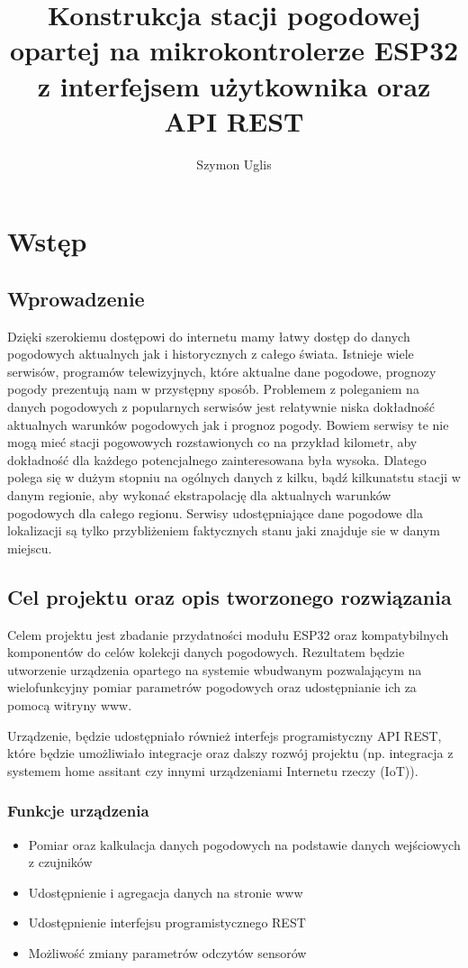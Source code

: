 \documentclass[12pt,a4paper]{article}
\title{Konstrukcja stacji pogodowej opartej na mikrokontrolerze ESP32 z interfejsem użytkownika oraz API REST}
\author{Szymon Uglis}
\begin{document}
\justifying

\nocite{*}

\begin{titlepage}
    
\end{titlepage}

\tableofcontents{}
\pagebreak

\section{Wstęp}

\subsection{Wprowadzenie}
Dzięki szerokiemu dostępowi do internetu mamy łatwy dostęp do danych pogodowych aktualnych jak i historycznych z całego świata. Istnieje wiele
serwisów, programów telewizyjnych, które aktualne dane pogodowe, prognozy pogody prezentują nam w przystępny sposób.
Problemem z poleganiem na danych pogodowych z popularnych serwisów jest relatywnie niska dokładność aktualnych warunków pogodowych jak i prognoz pogody.
Bowiem serwisy te nie mogą mieć stacji pogowowych rozstawionych co na przykład kilometr, aby dokładność dla każdego potencjalnego zainteresowana była wysoka.
Dlatego polega się w dużym stopniu na ogólnych danych z kilku, bądź kilkunatstu stacji w danym regionie, aby wykonać ekstrapolację dla
aktualnych warunków pogodowych dla całego regionu. 
Serwisy udostępniające dane pogodowe dla lokalizacji są tylko przybliżeniem faktycznych stanu jaki znajduje sie w danym miejscu. 

\subsection{Cel projektu oraz opis tworzonego rozwiązania}

Celem projektu jest zbadanie przydatności modułu ESP32 oraz kompatybilnych komponentów do celów kolekcji danych pogodowych. 
Rezultatem będzie utworzenie urządzenia opartego na systemie wbudwanym pozwalającym na wielofunkcyjny pomiar parametrów pogodowych oraz udostępnianie ich za pomocą witryny www.

Urządzenie, będzie udostępniało również interfejs programistyczny API REST, które będzie umożliwiało integracje oraz dalszy rozwój projektu 
(np. integracja z systemem home assitant czy innymi urządzeniami Internetu rzeczy (IoT)).

\subsubsection{Funkcje urządzenia}
\begin{itemize}
    \item Pomiar oraz kalkulacja danych pogodowych na podstawie danych wejściowych z czujników
    \item Udostępnienie i agregacja danych na stronie www
    \item Udostępnienie interfejsu programistycznego REST
    \item Możliwość zmiany parametrów odczytów sensorów
\end{itemize}
\end{document}
